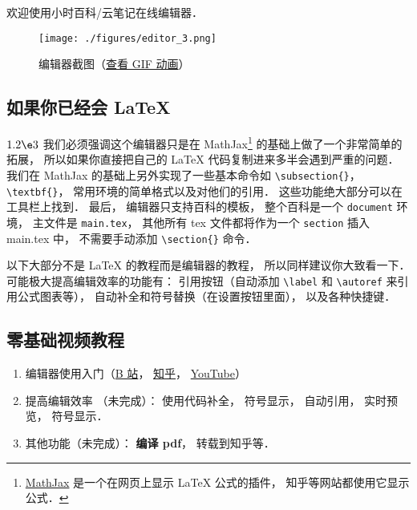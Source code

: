 
欢迎使用小时百科/云笔记在线编辑器．
\begin{figure}[ht]
\centering
\texttt{[image: ./figures/editor\_3.png]}
\caption{编辑器截图（\href{https://wuli.wiki/apps/editor.gif}{查看 GIF 动画}）} \label{editor_fig3}
\end{figure}

\subsection{如果你已经会 LaTeX}
$1.2\e3$ 我们必须强调这个编辑器只是在 MathJax\footnote{\href{https://www.mathjax.org/}{MathJax} 是一个在网页上显示 LaTeX 公式的插件， 知乎等网站都使用它显示公式．} 的基础上做了一个非常简单的拓展， 所以如果你直接把自己的 LaTeX 代码复制进来多半会遇到严重的问题． 我们在 MathJax 的基础上另外实现了一些基本命令如 \verb|\subsection{}|， \verb|\textbf{}|， 常用环境的简单格式以及对他们的引用． 这些功能绝大部分可以在工具栏上找到． 最后， 编辑器只支持百科的模板， 整个百科是一个 \verb|document| 环境， 主文件是 \verb|main.tex|， 其他所有 tex 文件都将作为一个 \verb|section| 插入 main.tex 中， 不需要手动添加 \verb|\section{}| 命令．

以下大部分不是 LaTeX 的教程而是编辑器的教程， 所以同样建议你大致看一下． 可能极大提高编辑效率的功能有： 引用按钮（自动添加 \verb|\label| 和 \verb|\autoref| 来引用公式图表等）， 自动补全和符号替换（在设置按钮里面）， 以及各种快捷键．

\subsection{零基础视频教程}
\begin{enumerate}
\item 编辑器使用入门（\href{https://www.bilibili.com/video/av87698355/}{B 站}， \href{https://zhuanlan.zhihu.com/p/105869878}{知乎}， \href{https://www.youtube.com/watch?v=AN2tXNanD9U&t=1s}{YouTube}）
\item 提高编辑效率 （未完成）： 使用代码补全， 符号显示， 自动引用， 实时预览， 符号显示．
\item 其他功能（未完成）： \textbf{编译 pdf}， 转载到知乎等．
\end{enumerate}

